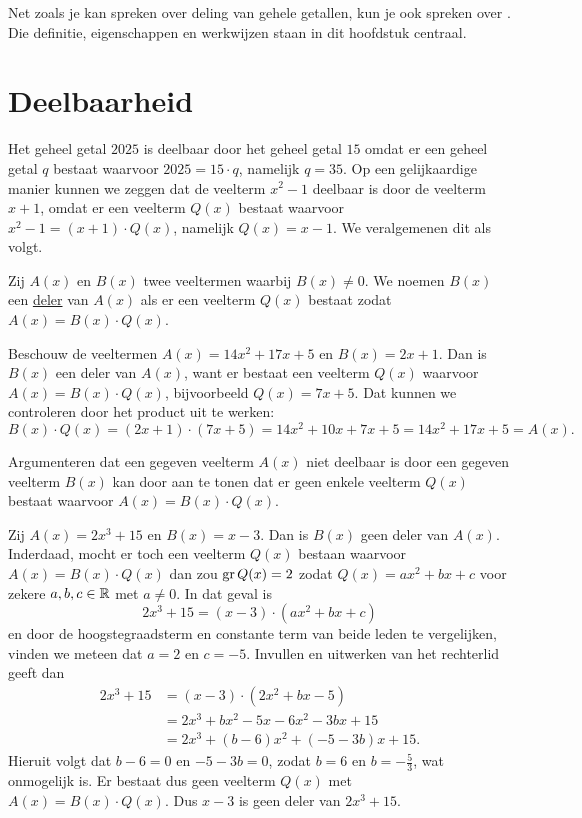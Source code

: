 \documentclass{ximera}
\begin{document}
	\author{Koen De Naeghel}
	\label{xim:veeltermen_deelbaarheid}

Net zoals je kan spreken over deling van gehele getallen, kun je ook spreken over . Die definitie, eigenschappen en werkwijzen staan in dit hoofdstuk centraal. 
\section{Deelbaarheid}

Het geheel getal $2025$ is deelbaar door het geheel getal $15$ omdat er een geheel getal $q$ bestaat waarvoor $2025 = 15\cdot q$, namelijk $q = 35$. Op een gelijkaardige manier kunnen we zeggen dat de veelterm $x^2-1$ deelbaar is door de veelterm $x+1$, omdat er een veelterm $Q(x)$ bestaat waarvoor $x^2-1 = (x+1)\cdot Q(x)$, namelijk $Q(x) = x-1$. We veralgemenen dit als volgt.

\begin{definition}[in woorden]\label{definitie:deler}
Zij $A(x)$ en $B(x)$ twee veeltermen waarbij $B(x) \neq 0$. 
We noemen $B(x)$ een \underline{deler} van $A(x)$ als er een veelterm $Q(x)$ bestaat zodat $A(x) = B(x)\cdot Q(x)$.
\end{definition}

\begin{example}
Beschouw de veeltermen $A(x) = 14x^2+17x+5$ en $B(x) = 2x+1$. Dan is $B(x)$ een deler van $A(x)$, want er bestaat een veelterm $Q(x)$ waarvoor $A(x) = B(x) \cdot Q(x)$, bijvoorbeeld $Q(x) = 7x+5$. Dat kunnen we controleren door het product %
uit te werken:
\[
B(x) \cdot Q(x) = (2x+1) \cdot (7x+5) = 14x^2 + 10x + 7x + 5 = 14x^2 + 17x + 5 = A(x).
\]
\end{example}

Argumenteren dat een gegeven veelterm $A(x)$ niet deelbaar is door een gegeven veelterm $B(x)$ kan door aan te tonen dat er geen enkele veelterm $Q(x)$ bestaat waarvoor $A(x) = B(x) \cdot Q(x)$. 

\begin{example} \label{geendeler}
Zij $A(x) = 2x^3+15$ en $B(x) = x-3$. Dan is $B(x)$ geen deler van $A(x)$. Inderdaad, mocht er toch een veelterm $Q(x)$ bestaan waarvoor $A(x) = B(x) \cdot Q(x)$ dan zou $\operatorname{gr} Q(x) = 2$ zodat $Q(x) = a x^2 + b x + c$ voor zekere $a,b,c \in \mathbb{R}$ met $a \neq 0$. In dat geval is
\[
2x^3+15 = (x-3) \cdot (a x^2 + b x + c) 
\]
en door de hoogstegraadsterm en constante term van beide leden te vergelijken, vinden we meteen dat $a = 2$ en $c = -5$. Invullen en uitwerken van het rechterlid geeft dan
\begin{align*}
2x^3+15 
& = (x-3) \cdot (2 x^2 + b x - 5) \\
& = 2x^3 + bx^2 - 5x - 6x^2 - 3bx + 15 \\
& = 2x^3 + (b-6)x^2 + (-5-3b)x + 15.
\end{align*}
Hieruit volgt dat $b - 6 = 0$ en $-5-3b = 0$, zodat $b = 6$ en $b = -\frac{5}{3}$, wat onmogelijk is. Er bestaat dus geen veelterm $Q(x)$ met $A(x) = B(x) \cdot Q(x)$. Dus $x-3$ is geen deler van $2x^3+15$. 
\end{example}
\end{document}

